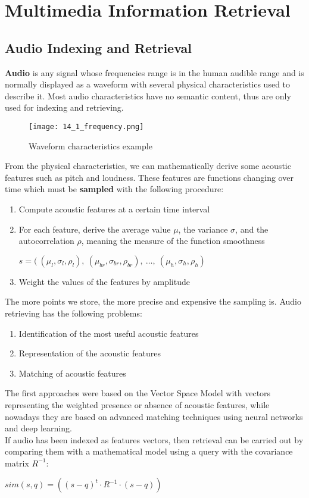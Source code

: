 \documentclass{article}
\begin{document}
\section{Multimedia Information Retrieval}
\subsection{Audio Indexing and Retrieval}
\textbf{Audio} is any signal whose frequencies range is in the human audible range and is normally displayed as a waveform with several physical characteristics used to describe it. Most audio characteristics have no semantic content, thus are only used for indexing and retrieving.
\begin{figure}[H]
    \centering
    \texttt{[image: 14\_1\_frequency.png]}
    \caption{Waveform characteristics example}
\end{figure}
From the physical characteristics, we can mathematically derive some acoustic features such as pitch and loudness. These features are functions changing over time which must be \textbf{sampled} with the following procedure:
\begin{enumerate}
    \item Compute acoustic features at a certain time interval
    \item For each feature, derive the average value $\mu$, the variance $\sigma$, and the autocorrelation $\rho$, meaning the measure of the function smoothness
        \begin{center}
            $ s = ( \ (\mu_l, \sigma_l, \rho_l), \ (\mu_{br}, \sigma_{br}, \rho_{br}), \ \dots, \ (\mu_h, \sigma_h, \rho_h) $
        \end{center}
    \item Weight the values of the features by amplitude
\end{enumerate}
The more points we store, the more precise and expensive the sampling is.
Audio retrieving has the following problems:
\begin{enumerate}
    \item Identification of the most useful acoustic features
    \item Representation of the acoustic features
    \item Matching of acoustic features
\end{enumerate}
The first approaches were based on the Vector Space Model with vectors representing the weighted presence or absence of acoustic features, while nowadays they are based on advanced matching techniques using neural networks and deep learning. \\
If audio has been indexed as features vectors, then retrieval can be carried out by comparing them with a mathematical model using a query with the covariance matrix $R^{-1}$:
\begin{center}
    $sim(s,q) = ((s-q)^t \cdot R^{-1} \cdot (s-q))$
\end{center}
\end{document}
